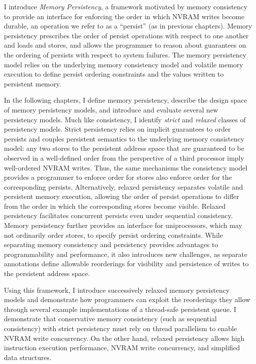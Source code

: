 I introduce \emph{Memory Persistency}, a framework motivated by memory consistency to provide an interface for enforcing the order in which NVRAM writes become durable, an operation we refer to as a ``persist'' (as in previous chapters).
Memory persistency prescribes the order of persist operations with respect to one another and loads and stores, and allows the programmer to reason about guarantees on the ordering of persists with respect to system failures.
The memory persistency model relies on the underlying memory consistency model and volatile memory execution to define persist ordering constraints and the values written to persistent memory.

In the following chapters, I define memory persistency, describe the design space of memory persistency models, and introduce and evaluate several new persistency models.
Much like consistency, I identify \emph{strict} and \emph{relaxed} classes of persistency models.
Strict persistency relies on implicit guarantees to order persists and couples persistent semantics to the underlying memory consistency model: any two stores to the persistent address space that are guaranteed to be observed in a well-defined order from the perspective of a third processor imply well-ordered NVRAM writes.
Thus, the same mechanisms the consistency model provides a programmer to enforce order for stores also enforce order for the corresponding persists. 
Alternatively, relaxed persistency separates volatile and persistent memory execution, allowing the order of persist operations to differ from the order in which the corresponding stores become visible.
Relaxed persistency facilitates concurrent persists even under sequential consistency.
Memory persistency further provides an interface for uniprocessors, which may not ordinarily order stores, to specify persist ordering constraints.
While separating memory consistency and persistency provides advantages to programmability and performance, it also introduces new challenges, as separate annotations define allowable reorderings for visibility and persistence of writes to the persistent address space.

Using this framework, I introduce successively relaxed memory persistency models and demonstrate how programmers can exploit the reorderings they allow through several example implementations of a thread-safe persistent queue.
I demonstrate that conservative memory consistency (such as sequential consistency) with strict persistency must rely on thread parallelism to enable NVRAM write concurrency.
On the other hand, relaxed persistency allows high instruction execution performance, NVRAM write concurrency, and simplified data structures.

